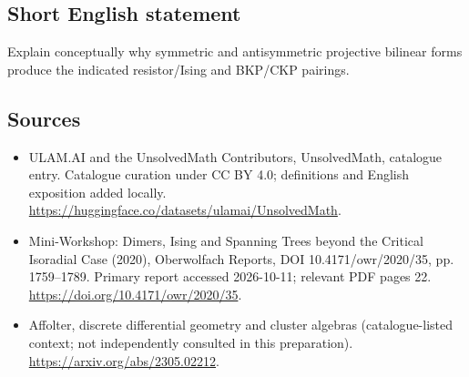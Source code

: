 \documentclass[11pt]{article}
\begin{document}
\subsection{Short English statement}
Explain conceptually why symmetric and antisymmetric projective bilinear forms produce the indicated resistor/Ising and BKP/CKP pairings.
\subsection{Sources}
\begin{itemize}
\item[\hypertarget{source:statement:1}{S1}] ULAM.AI and the UnsolvedMath Contributors, UnsolvedMath, catalogue entry. Catalogue curation under CC BY 4.0; definitions and English exposition added locally.
\url{https://huggingface.co/datasets/ulamai/UnsolvedMath}.
\item[\hypertarget{source:statement:2}{S2}] Mini-Workshop: Dimers, Ising and Spanning Trees beyond the Critical Isoradial Case (2020), Oberwolfach Reports, DOI 10.4171/owr/2020/35, pp. 1759--1789. Primary report accessed 2026-10-11; relevant PDF pages 22.
\url{https://doi.org/10.4171/owr/2020/35}.
\item[\hypertarget{source:statement:3}{S3}] Affolter, discrete differential geometry and cluster algebras (catalogue-listed context; not independently consulted in this preparation).
\url{https://arxiv.org/abs/2305.02212}.
\end{itemize}
\label{end:statement}
\end{document}
